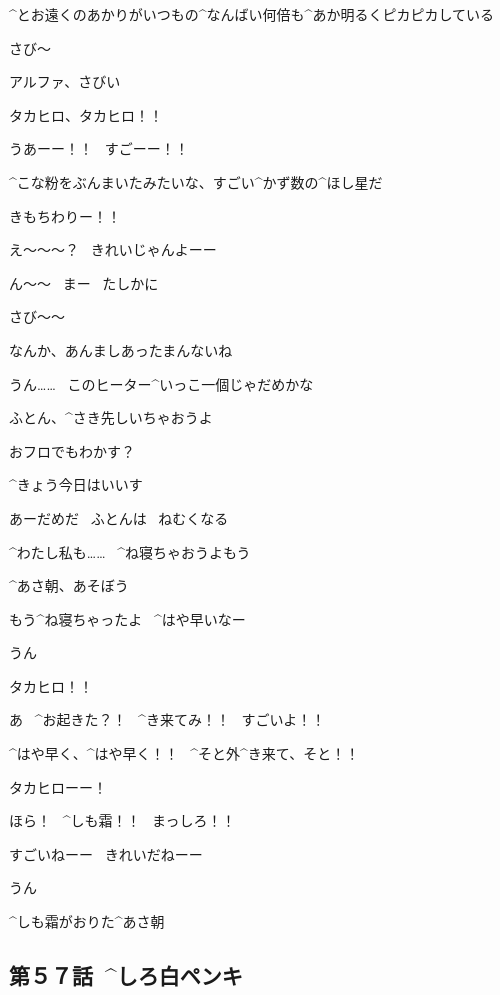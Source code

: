 \Takahiro ^{とお}{遠}くのあかりがいつもの^{なんばい}{何倍}も^{あか}{明}るくピカピカしている

\page[13]
\Alpha さび〜

\Takahiro アルファ、さびい

\Alpha タカヒロ、タカヒロ！！

\page[15]
\Alpha うあーー！！
\ すごーー！！

\Takahiro ^{こな}{粉}をぶんまいたみたいな、すごい^{かず}{数}の^{ほし}{星}だ

\Takahiro きもちわりー！！

\Alpha え〜〜〜？
\ きれいじゃんよーー

\Takahiro ん〜〜
\ まー
\ たしかに

\Takahiro さび〜〜

\page[16]
\Takahiro なんか、あんましあったまんないね

\Alpha うん……
\ このヒーター^{いっこ}{一個}じゃだめかな

\Alpha ふとん、^{さき}{先}しいちゃおうよ

\Alpha おフロでもわかす？

\Takahiro ^{きょう}{今日}はいいす

\page[17]
\Takahiro あーだめだ
\ ふとんは
\ ねむくなる

\Alpha ^{わたし}{私}も……
\ ^{ね}{寝}ちゃおうよもう

\Alpha ^{あさ}{朝}、あそぼう

\page[18]
\Takahiro もう^{ね}{寝}ちゃったよ
\ ^{はや}{早}いなー

\page[19]
\Alpha うん

\page[20]
\Alpha タカヒロ！！

\page[21]
\Alpha あ
\ ^{お}{起}きた？！
\ ^{き}{来}てみ！！
\ すごいよ！！

\Alpha ^{はや}{早}く、^{はや}{早}く！！
\ ^{そと}{外}^{き}{来}て、そと！！

\Alpha タカヒローー！

\page[22]
\Alpha ほら！
\ ^{しも}{霜}！！
\ まっしろ！！

\page[23]
\Alpha すごいねーー
\ きれいだねーー

\page[24]
\Takahiro うん

\Takahiro ^{しも}{霜}がおりた^{あさ}{朝}


\subsection{第５７話\ ^{しろ}{白}ペンキ}

